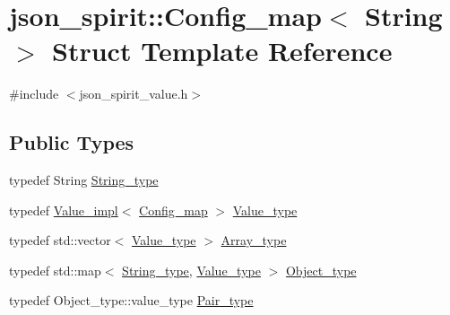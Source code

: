 \hypertarget{structjson__spirit_1_1_config__map}{}\section{json\+\_\+spirit\+:\+:Config\+\_\+map$<$ String $>$ Struct Template Reference}
\label{structjson__spirit_1_1_config__map}


{\ttfamily \#include $<$json\+\_\+spirit\+\_\+value.\+h$>$}

\subsection*{Public Types}
\begin{DoxyCompactItemize}
\item 
typedef String \hyperlink{structjson__spirit_1_1_config__map_abcfbacb1047e017b281210332f574b87}{String\+\_\+type}
\item 
typedef \hyperlink{classjson__spirit_1_1_value__impl}{Value\+\_\+impl}$<$ \hyperlink{structjson__spirit_1_1_config__map}{Config\+\_\+map} $>$ \hyperlink{structjson__spirit_1_1_config__map_a1beec86663fb1ca76e98852b93a90c5c}{Value\+\_\+type}
\item 
typedef std\+::vector$<$ \hyperlink{structjson__spirit_1_1_config__map_a1beec86663fb1ca76e98852b93a90c5c}{Value\+\_\+type} $>$ \hyperlink{structjson__spirit_1_1_config__map_a2efd6f753201c1c08c30d96e27c192d7}{Array\+\_\+type}
\item 
typedef std\+::map$<$ \hyperlink{structjson__spirit_1_1_config__map_abcfbacb1047e017b281210332f574b87}{String\+\_\+type}, \hyperlink{structjson__spirit_1_1_config__map_a1beec86663fb1ca76e98852b93a90c5c}{Value\+\_\+type} $>$ \hyperlink{structjson__spirit_1_1_config__map_a64fd50a8a903e22e3909e83244a0c92f}{Object\+\_\+type}
\item 
typedef Object\+\_\+type\+::value\+\_\+type \hyperlink{structjson__spirit_1_1_config__map_a2fe4847e01358c060b7a20cfce43305c}{Pair\+\_\+type}
\end{DoxyCompactItemize}
